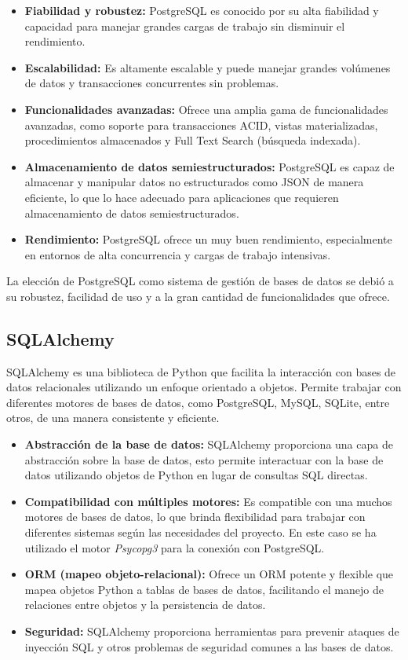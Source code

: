 \begin{itemize}
	\item \textbf{Fiabilidad y robustez:} PostgreSQL es conocido por su alta fiabilidad y capacidad para manejar grandes cargas de trabajo sin disminuir el rendimiento.
	\item \textbf{Escalabilidad:} Es altamente escalable y puede manejar grandes volúmenes de datos y transacciones concurrentes sin problemas.
	\item \textbf{Funcionalidades avanzadas:} Ofrece una amplia gama de funcionalidades avanzadas, como soporte para transacciones ACID, vistas materializadas, procedimientos almacenados y Full Text Search (búsqueda indexada).
	\item \textbf{Almacenamiento de datos semiestructurados:} PostgreSQL es capaz de almacenar y manipular datos no estructurados como JSON de manera eficiente, lo que lo hace adecuado para aplicaciones que requieren almacenamiento de datos semiestructurados.
	\item \textbf{Rendimiento:} PostgreSQL ofrece un muy buen rendimiento, especialmente en entornos de alta concurrencia y cargas de trabajo intensivas.
\end{itemize}

\noindent La elección de PostgreSQL como sistema de gestión de bases de datos se debió a su robustez, facilidad de uso y a la gran cantidad de funcionalidades que ofrece.

\subsection{SQLAlchemy}
SQLAlchemy es una biblioteca de Python que facilita la interacción con bases de datos relacionales utilizando un enfoque orientado a objetos. Permite trabajar con diferentes motores de bases de datos, como PostgreSQL, MySQL, SQLite, entre otros, de una manera consistente y eficiente.

\begin{itemize}
	\item \textbf{Abstracción de la base de datos:} SQLAlchemy proporciona una capa de abstracción sobre la base de datos, esto permite interactuar con la base de datos utilizando objetos de Python en lugar de consultas SQL directas.
	\item \textbf{Compatibilidad con múltiples motores:} Es compatible con una muchos motores de bases de datos, lo que brinda flexibilidad para trabajar con diferentes sistemas según las necesidades del proyecto. En este caso se ha utilizado el motor \textit{Psycopg3} para la conexión con PostgreSQL.
	\item \textbf{ORM (mapeo objeto-relacional):} Ofrece un ORM potente y flexible que mapea objetos Python a tablas de bases de datos, facilitando el manejo de relaciones entre objetos y la persistencia de datos.
	\item \textbf{Seguridad:} SQLAlchemy proporciona herramientas para prevenir ataques de inyección SQL y otros problemas de seguridad comunes a las bases de datos.
\end{itemize}

